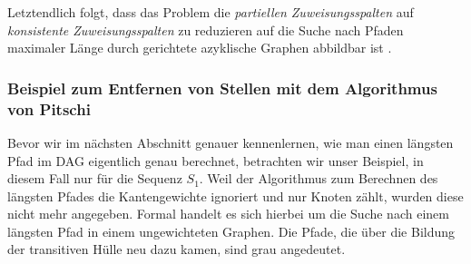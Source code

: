 Letztendlich folgt, dass das Problem die \emph{partiellen Zuweisungsspalten} auf \emph{konsistente Zuweisungsspalten} zu reduzieren auf die Suche nach Pfaden maximaler Länge durch gerichtete azyklische Graphen abbildbar ist \citep{cpm10}.

\subsubsection{Beispiel zum Entfernen von Stellen mit dem Algorithmus von Pitschi}

Bevor wir im nächsten Abschnitt genauer kennenlernen, wie man einen längsten Pfad im DAG eigentlich genau berechnet, betrachten wir unser Beispiel, in diesem Fall nur für die Sequenz $S_1$. Weil der Algorithmus zum Berechnen des längsten Pfades die Kantengewichte ignoriert und nur Knoten zählt, wurden diese nicht mehr angegeben. Formal handelt es sich hierbei um die Suche nach einem längsten Pfad in einem ungewichteten Graphen. Die Pfade, die über die Bildung der transitiven Hülle neu dazu kamen, sind grau angedeutet.

